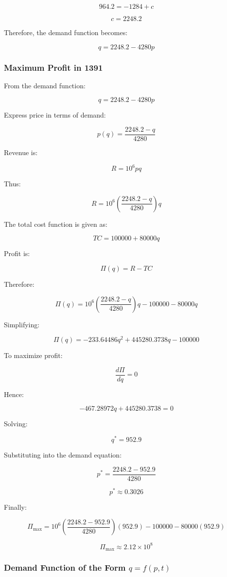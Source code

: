\documentclass{KPS_assignment}
\begin{document}
\[
964.2=-1284+c
\]

\[
c=2248.2
\]

Therefore, the demand function becomes:

\[
\boxed{
q=2248.2-4280p
}
\]



\subsubsection{Maximum Profit in 1391}

From the demand function:

\[
q=2248.2-4280p
\]

Express price in terms of demand:

\[
p(q)=\frac{2248.2-q}{4280}
\]

Revenue is:

\[
R=10^6pq
\]

Thus:

\[
R=
10^6
\left(
\frac{2248.2-q}{4280}
\right)
q
\]

The total cost function is given as:

\[
TC=100000+80000q
\]

Profit is:

\[
\Pi(q)=R-TC
\]

Therefore:

\[
\Pi(q)=
10^6
\left(
\frac{2248.2-q}{4280}
\right)q
-100000
-80000q
\]

Simplifying:

\[
\Pi(q)=
-233.64486q^2
+445280.3738q
-100000
\]

To maximize profit:

\[
\frac{d\Pi}{dq}=0
\]

Hence:

\[
-467.28972q+445280.3738=0
\]

Solving:

\[
\boxed{
q^*=952.9
}
\]

Substituting into the demand equation:

\[
p^*=
\frac{2248.2-952.9}{4280}
\]

\[
\boxed{
p^*\approx0.3026
}
\]

Finally:

\[
\Pi_{\max}
=
10^6
\left(
\frac{2248.2-952.9}{4280}
\right)
(952.9)
-100000
-80000(952.9)
\]

\[
\boxed{
\Pi_{\max}\approx2.12\times10^8
}
\]



\subsubsection{Demand Function of the Form $q=f(p,t)$}
\end{document}

